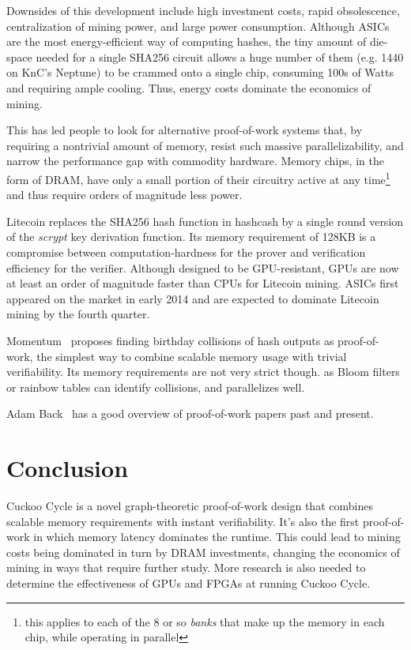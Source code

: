 \documentclass[11pt, oneside]{article}
\begin{document}
Downsides of this development include high investment costs, rapid
obsolescence, centralization of mining power, and large power consumption.
Although ASICs are the most energy-efficient way of computing hashes,
the tiny amount of die-space needed for a single SHA256 circuit allows
a huge number of them (e.g. 1440 on KnC's Neptune) to be crammed onto a
single chip, consuming 100s of Watts and requiring ample cooling.
Thus, energy costs dominate the economics of mining.

This has led people to look for alternative proof-of-work systems
that, by requiring a nontrivial amount of memory, resist such
massive parallelizability, and narrow the performance gap
with commodity hardware. Memory chips, in the form of DRAM,
have only a small portion of their circuitry active at any
time\footnote{this applies to each of the 8 or so {\em banks} that make up the memory in each chip,
while operating in parallel} and thus require orders of magnitude less power.

Litecoin replaces the SHA256 hash function in hashcash by a single round
version of the {\em scrypt} key derivation function. Its memory requirement
of 128KB is a compromise between computation-hardness for the prover and
verification efficiency for the verifier. Although designed to be
GPU-resistant, GPUs are now at least an order of magnitude faster
than CPUs for Litecoin mining. ASICs first appeared on the market in early 2014
and are expected to dominate Litecoin mining by the fourth quarter.

Momentum~\cite{larimer2013} proposes finding birthday collisions of hash
outputs as proof-of-work, the simplest way to combine scalable memory usage
with trivial verifiability. Its memory requirements are not very strict
though. as Bloom filters or rainbow tables can identify collisions, and
parallelizes well.

Adam Back~\cite{back2014} has a good overview of proof-of-work papers past
and present.

\section{Conclusion}
Cuckoo Cycle is a novel graph-theoretic proof-of-work design that combines scalable
memory requirements with instant verifiability. It's also the first proof-of-work in
which memory latency dominates the runtime.
This could lead to mining costs being dominated in turn by DRAM investments,
changing the economics of mining in ways that require further study.
More research is also needed to determine the effectiveness of GPUs and FPGAs
at running Cuckoo Cycle.
\end{document}
